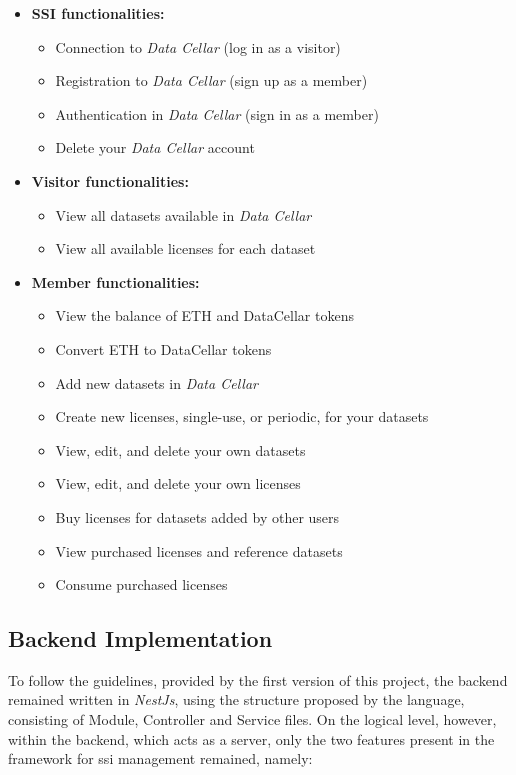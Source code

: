 \begin{itemize}
  \item \textbf{SSI functionalities:}
  \begin{itemize}
      \item Connection to \textit{Data Cellar} (log in as a visitor)
      \item Registration to \textit{Data Cellar} (sign up as a member)
      \item Authentication in \textit{Data Cellar} (sign in as a member)
      \item Delete your \textit{Data Cellar} account
  \end{itemize}
  
  \item \textbf{Visitor functionalities:}
  \begin{itemize}
      \item View all datasets available in \textit{Data Cellar}
      \item View all available licenses for each dataset
  \end{itemize}
  
  \item \textbf{Member functionalities:}
  \begin{itemize}
      \item View the balance of ETH and DataCellar tokens
      \item Convert ETH to DataCellar tokens
      \item Add new datasets in \textit{Data Cellar}
      \item Create new licenses, single-use, or periodic, for your datasets
      \item View, edit, and delete your own datasets
      \item View, edit, and delete your own licenses
      \item Buy licenses for datasets added by other users
      \item View purchased licenses and reference datasets
      \item Consume purchased licenses
  \end{itemize}
\end{itemize}

\subsection{Backend Implementation}

To follow the guidelines, provided by the first version of this project, the backend remained written in \textit{NestJs}, using the structure proposed by the language, consisting of 
Module, Controller and Service files. On the logical level, however, within the backend, which acts as a server, only the two features present in the framework for \gls{ssi} 
management remained, namely:

